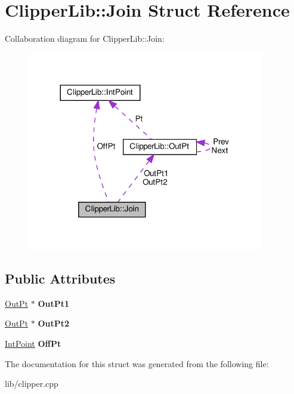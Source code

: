 \hypertarget{struct_clipper_lib_1_1_join}{}\section{Clipper\+Lib\+:\+:Join Struct Reference}
\label{struct_clipper_lib_1_1_join}


Collaboration diagram for Clipper\+Lib\+:\+:Join\+:
\nopagebreak
\begin{figure}[H]
\begin{center}
\leavevmode
\includegraphics[width=293pt]{struct_clipper_lib_1_1_join__coll__graph}
\end{center}
\end{figure}
\subsection*{Public Attributes}
\begin{DoxyCompactItemize}
\item 
\mbox{\label{struct_clipper_lib_1_1_join_a83d7ff096b1cf9425f1c814b7ee5a55d}} 
\hyperlink{struct_clipper_lib_1_1_out_pt}{Out\+Pt} $\ast$ {\bfseries Out\+Pt1}
\item 
\mbox{\label{struct_clipper_lib_1_1_join_a589b2e1162679def2ccd3889306a9230}} 
\hyperlink{struct_clipper_lib_1_1_out_pt}{Out\+Pt} $\ast$ {\bfseries Out\+Pt2}
\item 
\mbox{\label{struct_clipper_lib_1_1_join_afa70561700d774cd762d125f9866327f}} 
\hyperlink{struct_clipper_lib_1_1_int_point}{Int\+Point} {\bfseries Off\+Pt}
\end{DoxyCompactItemize}


The documentation for this struct was generated from the following file\+:\begin{DoxyCompactItemize}
\item 
lib/clipper.\+cpp\end{DoxyCompactItemize}

